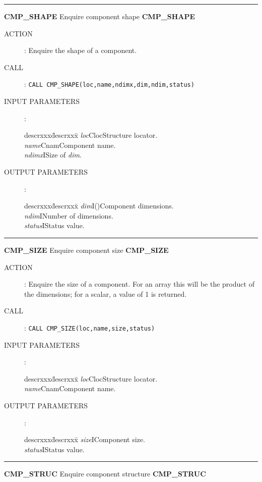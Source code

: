 \goodbreak
\rule{\textwidth}{0.3mm}
{\Large {\bf CMP\_SHAPE} \hfill Enquire component shape \hfill {\bf CMP\_SHAPE}}
\begin{description}
\item [ACTION]:
Enquire the shape of a component.
\item [CALL]:
{\tt CALL CMP\_SHAPE(loc,name,ndimx,dim,ndim,status)}
\item [INPUT PARAMETERS]:
\begin{tabbing}
descrxxx\=descrxxx\=\kill
{\em loc}\>Cloc\>Structure locator.\\
{\em name}\>Cnam\>Component name.\\
{\em ndimx}\>I\>Size of {\em dim}.
\end{tabbing}
\item [OUTPUT PARAMETERS]:
\begin{tabbing}
descrxxx\=descrxxx\=\kill
{\em dim}\>I()\>Component dimensions.\\
{\em ndim}\>I\>Number of dimensions.\\
{\em status}\>I\>Status value.
\end{tabbing}
\end{description}
\goodbreak
\rule{\textwidth}{0.3mm}
{\Large {\bf CMP\_SIZE} \hfill Enquire component size \hfill {\bf CMP\_SIZE}}
\begin{description}
\item [ACTION]:
Enquire the size of a component.
For an array this will be the product of the dimensions; for a scalar, a
value of 1 is returned.
\item [CALL]:
{\tt CALL CMP\_SIZE(loc,name,size,status)}
\item [INPUT PARAMETERS]:
\begin{tabbing}
descrxxx\=descrxxx\=\kill
{\em loc}\>Cloc\>Structure locator.\\
{\em name}\>Cnam\>Component name.
\end{tabbing}
\item [OUTPUT PARAMETERS]:
\begin{tabbing}
descrxxx\=descrxxx\=\kill
{\em size}\>I\>Component size.\\
{\em status}\>I\>Status value.
\end{tabbing}
\end{description}
\goodbreak
\rule{\textwidth}{0.3mm}
{\Large {\bf CMP\_STRUC} \hfill Enquire component structure \hfill {\bf CMP\_STRUC}}
